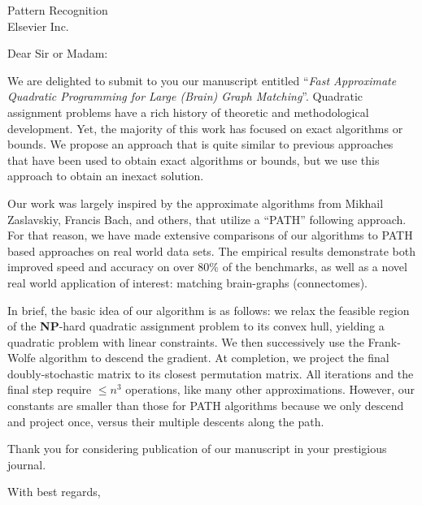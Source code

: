 \documentclass{letter}
\begin{document}
\begin{letter}{Pattern Recognition \\ 
Elsevier Inc.}
	
	 
	
	  
	
\opening{Dear Sir or Madam:}

We are delighted to submit to you our manuscript entitled ``\emph{Fast Approximate Quadratic Programming for Large (Brain) Graph Matching}''.  Quadratic assignment problems have a rich history of theoretic and methodological development.  Yet, the majority of this work has focused on exact algorithms or bounds.  We propose an approach that is quite similar to previous approaches that have been used to obtain exact algorithms or bounds, but we use this approach to obtain an inexact solution. 

Our work was largely inspired by the approximate algorithms 
from Mikhail Zaslavskiy, Francis Bach, and others,
that utilize a ``PATH'' following approach. For that reason, we have made extensive comparisons of our algorithms to PATH based approaches on real world data sets.  The empirical results demonstrate both improved speed and accuracy on over $80\%$ of the benchmarks, as well as a novel real world application of interest: matching brain-graphs (connectomes).

In brief, the basic idea of our algorithm is as follows: we relax the feasible region of the \textbf{NP}-hard quadratic assignment problem to its convex hull, yielding a quadratic problem with linear constraints.  We then successively use the Frank-Wolfe algorithm to descend the gradient.  At completion, we project the final doubly-stochastic matrix to its closest permutation matrix.  All iterations and the final step require $\leq n^3$ operations, like many other approximations.  However, our constants are smaller than those for PATH algorithms because we only descend and project once, versus their multiple descents along the path.  

Thank you for considering publication of our manuscript in your prestigious journal.


\closing{With best regards,}

\end{letter}
\end{document}
